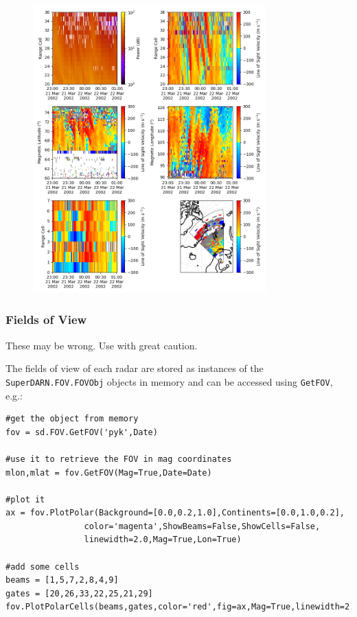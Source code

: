 				\begin{figure}
					\centering\includegraphics[width=0.8\textwidth]{figures/ch05_sdexample.png}
				\end{figure}

			\subsubsection{Fields of View}
			
				These may be wrong. Use with great caution.
			
				The fields of view of each radar are stored as instances of the \texttt{SuperDARN.FOV.FOVObj} objects in memory and can be accessed using \texttt{GetFOV}, e.g.:
			
				\begin{verbatim}
#get the object from memory
fov = sd.FOV.GetFOV('pyk',Date)
			
#use it to retrieve the FOV in mag coordinates
mlon,mlat = fov.GetFOV(Mag=True,Date=Date)
			
#plot it
ax = fov.PlotPolar(Background=[0.0,0.2,1.0],Continents=[0.0,1.0,0.2],
				color='magenta',ShowBeams=False,ShowCells=False,
				linewidth=2.0,Mag=True,Lon=True)
			
#add some cells
beams = [1,5,7,2,8,4,9]
gates = [20,26,33,22,25,21,29]
fov.PlotPolarCells(beams,gates,color='red',fig=ax,Mag=True,linewidth=2.0,Lon=True)
				\end{verbatim}
			
